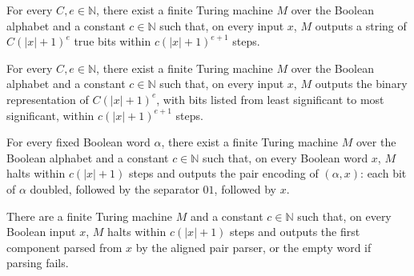 \begin{theorem}
\label{Turing.FinTM.computesFunInTime_polyUnary}
\leanok
{}
For every $C,e\in\mathbb{N}$, there exist a finite Turing machine $M$ over the Boolean
alphabet and a constant $c\in\mathbb{N}$ such that, on every input $x$, $M$ outputs a
string of $C(|x|+1)^e$ true bits within $c(|x|+1)^{e+1}$ steps.
\end{theorem}

\begin{theorem}
\label{Turing.FinTM.computesFunInTime_polyBits}
\leanok
{}
For every $C,e\in\mathbb{N}$, there exist a finite Turing machine $M$ over the Boolean
alphabet and a constant $c\in\mathbb{N}$ such that, on every input $x$, $M$ outputs the
binary representation of $C(|x|+1)^e$, with bits listed from least significant to most
significant, within $c(|x|+1)^{e+1}$ steps.
\end{theorem}

\begin{theorem}
\label{Turing.FinTM.computesFunInTime_pairEncodeFixed}
\leanok
{}
For every fixed Boolean word $\alpha$, there exist a finite Turing machine $M$ over the
Boolean alphabet and a constant $c\in\mathbb{N}$ such that, on every Boolean word $x$,
$M$ halts within $c(|x|+1)$ steps and outputs the pair encoding of $(\alpha,x)$: each
bit of $\alpha$ doubled, followed by the separator $01$, followed by $x$.
\end{theorem}

\begin{theorem}
\label{Turing.FinTM.computesFunInTime_pairFst}
\leanok
{}
There are a finite Turing machine $M$ and a constant $c\in\mathbb{N}$ such that, on
every Boolean input $x$, $M$ halts within $c(|x|+1)$ steps and outputs the first
component parsed from $x$ by the aligned pair parser, or the empty word if parsing
fails.
\end{theorem}

